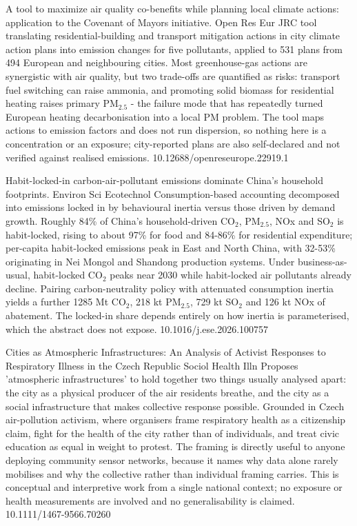 \documentclass[10pt]{article}
\begin{document}
\clearpage


{A tool to maximize air quality co-benefits while planning local climate actions: application to the Covenant of Mayors initiative.}
{Open Res Eur}
{JRC tool translating residential-building and transport mitigation actions in city climate action plans into emission changes for five pollutants, applied to 531 plans from 494 European and neighbouring cities. Most greenhouse-gas actions are synergistic with air quality, but two trade-offs are quantified as risks: transport fuel switching can raise ammonia, and promoting solid biomass for residential heating raises primary PM$_{2.5}$ - the failure mode that has repeatedly turned European heating decarbonisation into a local PM problem. The tool maps actions to emission factors and does not run dispersion, so nothing here is a concentration or an exposure; city-reported plans are also self-declared and not verified against realised emissions.}
{10.12688/openreseurope.22919.1}

{Habit-locked-in carbon-air-pollutant emissions dominate China's household footprints.}
{Environ Sci Ecotechnol}
{Consumption-based accounting decomposed into emissions locked in by behavioural inertia versus those driven by demand growth. Roughly 84\% of China's household-driven CO$_2$, PM$_{2.5}$, NOx and SO$_2$ is habit-locked, rising to about 97\% for food and 84-86\% for residential expenditure; per-capita habit-locked emissions peak in East and North China, with 32-53\% originating in Nei Mongol and Shandong production systems. Under business-as-usual, habit-locked CO$_2$ peaks near 2030 while habit-locked air pollutants already decline. Pairing carbon-neutrality policy with attenuated consumption inertia yields a further 1285 Mt CO$_2$, 218 kt PM$_{2.5}$, 729 kt SO$_2$ and 126 kt NOx of abatement. The locked-in share depends entirely on how inertia is parameterised, which the abstract does not expose.}
{10.1016/j.ese.2026.100757}

{Cities as Atmospheric Infrastructures: An Analysis of Activist Responses to Respiratory Illness in the Czech Republic}
{Sociol Health Illn}
{Proposes 'atmospheric infrastructures' to hold together two things usually analysed apart: the city as a physical producer of the air residents breathe, and the city as a social infrastructure that makes collective response possible. Grounded in Czech air-pollution activism, where organisers frame respiratory health as a citizenship claim, fight for the health of the city rather than of individuals, and treat civic education as equal in weight to protest. The framing is directly useful to anyone deploying community sensor networks, because it names why data alone rarely mobilises and why the collective rather than individual framing carries. This is conceptual and interpretive work from a single national context; no exposure or health measurements are involved and no generalisability is claimed.}
{10.1111/1467-9566.70260}
\end{document}
